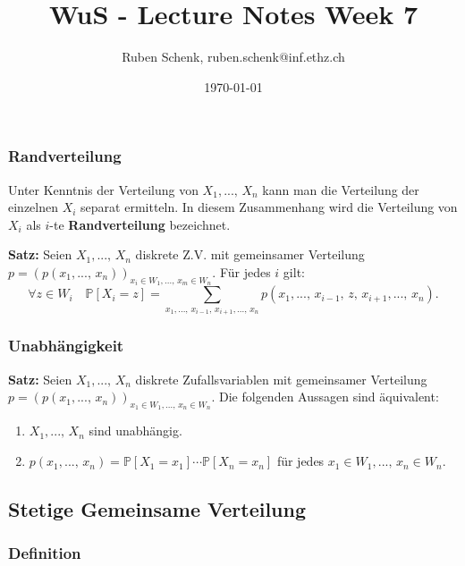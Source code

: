 \documentclass[a4paper]{extarticle}
\title{WuS - Lecture Notes Week 7}
\author{Ruben Schenk, ruben.schenk@inf.ethz.ch}
\date{\today}
\begin{document}
\maketitle

\subsubsection{Randverteilung}

Unter Kenntnis der Verteilung von $X_1,..., \, X_n$ kann man die Verteilung der einzelnen $X_i$ separat ermitteln. In diesem Zusammenhang wird die Verteilung von $X_i$ als $i$-te \textbf{Randverteilung} bezeichnet.

\begin{cbox}
    \textbf{Satz:} Seien $X_1,..., \, X_n$ diskrete Z.V. mit gemeinsamer Verteilung $p = (p(x_1,..., \, x_n))_{x_i \in W_1,..., \, x_m \in W_n}$. Für jedes $i$ gilt:
    \[
        \forall z \in W_i \quad \mathbb{P}[X_i = z] = \sum_{x_1,..., \, x_{i-1}, \, x_{i + 1},..., \, x_n} p(x_1,..., \, x_{i-1}, \, z, \, x_{i+1},..., \, x_n).
    \]
\end{cbox}

\subsubsection{Unabhängigkeit}

\begin{cbox}
    \textbf{Satz:} Seien $X_1,..., \, X_n$ diskrete Zufallsvariablen mit gemeinsamer Verteilung $p = (p(x_1,..., \, x_n))_{x_1 \in W_1,..., \, x_n \in W_n}$. Die folgenden Aussagen sind äquivalent:

    \begin{enumerate}
        \item $X_1,..., \, X_n$ sind unabhängig.
        \item $p(x_1,..., \, x_n) = \mathbb{P}[X_1 = x_1] \cdots \mathbb{P}[X_n = x_n]$ für jedes $x_1 \in W_1,..., \, x_n \in W_n$.
    \end{enumerate}
\end{cbox}

\subsection{Stetige Gemeinsame Verteilung}

\subsubsection{Definition}
\end{document}
